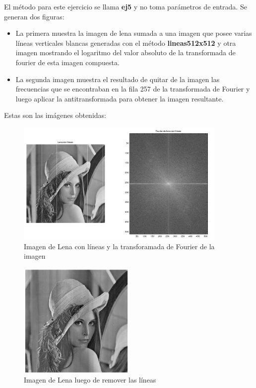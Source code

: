 \documentclass{article}
\begin{document}
El método para este ejercicio se llama \textbf{ej5} y no toma parámetros de entrada. Se generan dos figuras:
\begin{itemize}
\item La primera muestra la imagen de lena sumada a una imagen que posee varias líneas verticales blancas generadas con el método \textbf{lineas512x512} y otra imagen mostrando el logaritmo del valor absoluto de la transformada de fourier de esta imagen compuesta.
\item La segunda imagen muestra el resultado de quitar de la imagen las frecuencias que se encontraban en la fila 257 de la transformada de Fourier y luego aplicar la antitransformada para obtener la imagen resultante.
\end{itemize}

Estas son las imágenes obtenidas:

\begin{figure}[H]
        \includegraphics[width=0.9\textwidth]{ej5.png}
    \caption{Imagen de Lena con líneas y la transforamada de Fourier de la imagen}
\end{figure}
\begin{figure}[H]
\centering
    \includegraphics[width=0.5\textwidth]{lenaSinLineas.png}
    \caption{Imagen de Lena luego de remover las líneas}
\end{figure}
\end{document}
